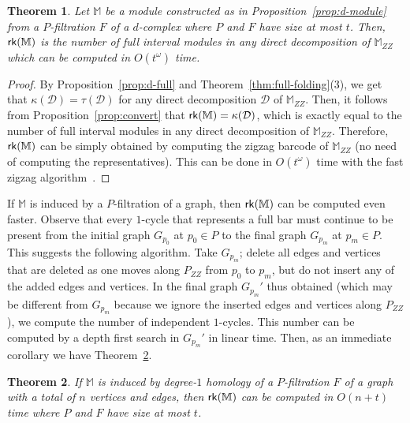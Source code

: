 \documentclass[11pt]{article}
\theoremstyle{plain}%
\newtheorem{theorem}{Theorem}[section]
\newcommand{\M}{\mathbb{M}}
\newcommand{\D}{\mathcal{D}}
\newcommand{\rk}{{\sf{rk}}}
\begin{document}
\begin{theorem}
    Let $\M$ be a module constructed as in Proposition~\ref{prop:d-module} from a $P$-filtration $F$ of a $d$-complex where $P$ and $F$ have size at most $t$. Then, $\rk(\M)$ is the number of full interval modules in any direct decomposition of $\M_{ZZ}$ which can be computed in $O(t^\omega)$ time. 
    \label{thm:d-complex}
\end{theorem}
\begin{proof}
    By Proposition~\ref{prop:d-full} and Theorem~\ref{thm:full-folding}(3), we get that $\kappa(\D)=\tau(\D)$ for any direct
    decomposition $\D$ of $\M_{ZZ}$. Then, it follows from
    Proposition~\ref{prop:convert} that $\rk(\M)=\kappa(\D)$, which is exactly equal to the number of full interval modules in any direct decomposition of $\M_{ZZ}$. Therefore, $\rk(\M)$ can be simply obtained by computing the zigzag barcode of $\M_{ZZ}$ (no need of computing the representatives). This can be done in $O(t^\omega)$ time with the fast zigzag algorithm~\cite{DH22}. 
\end{proof}
If $\M$ is induced by a $P$-filtration of a graph, then $\rk(\M)$ can be computed even faster. 
Observe that every $1$-cycle that represents a full bar must continue to be present from the initial graph $G_{p_0}$ at $p_0\in P$ to the final graph $G_{p_m}$ at $p_m\in P$. This suggests the following algorithm. Take $G_{p_m}$; delete all edges and vertices that are deleted as one moves along $P_{ZZ}$ from $p_0$ to $p_m$, but do not insert any of the added edges and vertices. In the final graph $G_{p_m}'$ thus obtained (which may be different from $G_{p_m}$ because we ignore the inserted edges and vertices along $P_{ZZ}$), we compute the number of independent $1$-cycles. This number can be computed by a depth first search in $G_{p_m}'$ in linear time. Then, as an immediate corollary we have Theorem~\ref{thm:graph}.
\begin{theorem}
    If $\M$ is induced by degree-$1$ homology of a $P$-filtration $F$ of a graph with a total of $n$ vertices and edges, then $\rk(\M)$ can be computed in $O(n+t)$ time where $P$ and $F$ have size at most $t$.
    \label{thm:graph}
\end{theorem}
\end{document}
